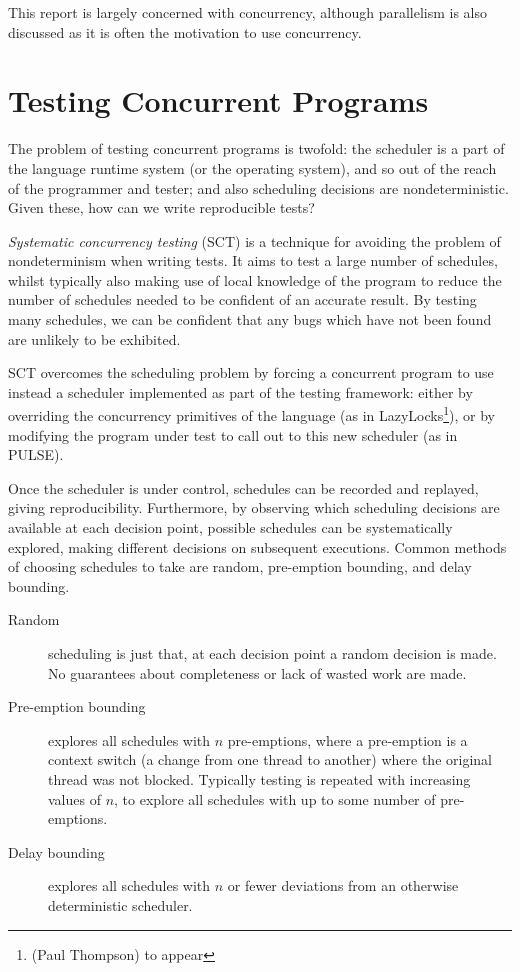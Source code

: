 This report is largely concerned with concurrency, although
parallelism is also discussed as it is often the motivation to use
concurrency.

\section{Testing Concurrent Programs}
\label{sec:intro-sct}

The problem of testing concurrent programs is twofold: the scheduler
is a part of the language runtime system (or the operating system),
and so out of the reach of the programmer and tester; and also
scheduling decisions are nondeterministic. Given these, how can we
write reproducible tests?

\textit{Systematic concurrency testing} (SCT)\cite{pbound, dbound,
  empirical, heisenbugs} is a technique for avoiding the problem of
nondeterminism when writing tests. It aims to test a large number of
schedules, whilst typically also making use of local knowledge of the
program to reduce the number of schedules needed to be confident of an
accurate result. By testing many schedules, we can be confident that
any bugs which have not been found are unlikely to be exhibited.

SCT overcomes the scheduling problem by forcing a concurrent program
to use instead a scheduler implemented as part of the testing
framework: either by overriding the concurrency primitives of the
language (as in LazyLocks\footnote{(Paul Thompson) to appear}), or by
modifying the program under test to call out to this new scheduler (as
in PULSE\cite{pulse}).

Once the scheduler is under control, schedules can be recorded and
replayed, giving reproducibility. Furthermore, by observing which
scheduling decisions are available at each decision point, possible
schedules can be systematically explored, making different decisions
on subsequent executions. Common methods of choosing schedules to take
are random\cite{empirical}, pre-emption bounding\cite{pbound}, and
delay bounding\cite{dbound}.

\begin{description}
  \item[Random] scheduling is just that, at each decision point a
    random decision is made. No guarantees about completeness or lack
    of wasted work are made.

  \item[Pre-emption bounding] explores all schedules with $n$
    pre-emptions, where a pre-emption is a context switch (a change
    from one thread to another) where the original thread was not
    blocked. Typically testing is repeated with increasing values of
    $n$, to explore all schedules with up to some number of
    pre-emptions.

  \item[Delay bounding] explores all schedules with $n$ or fewer
    deviations from an otherwise deterministic scheduler.
\end{description}

